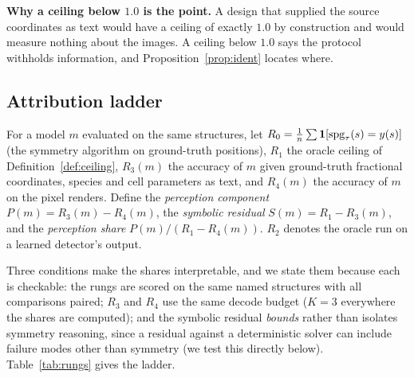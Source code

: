 \textbf{Why a ceiling below $1.0$ is the point.} A design that supplied the source coordinates as text
would have a ceiling of exactly $1.0$ by construction and would measure nothing about the images. A ceiling
below $1.0$ says the protocol withholds information, and Proposition~\ref{prop:ident} locates where.

\subsection{Attribution ladder}
\label{sec:ladder}

\begin{definition}
\label{def:ladder}
For a model $m$ evaluated on the same structures, let
$R_0 = \tfrac{1}{n}\sum \mathbf{1}[\mathrm{spg}_\tau(s) = y(s)]$ (the symmetry algorithm on ground-truth positions),
$R_1$ the oracle ceiling of Definition~\ref{def:ceiling},
$R_3(m)$ the accuracy of $m$ given ground-truth fractional coordinates, species and cell parameters as
text, and
$R_4(m)$ the accuracy of $m$ on the pixel renders. Define the \emph{perception component}
$P(m) = R_3(m) - R_4(m)$, the \emph{symbolic residual} $S(m) = R_1 - R_3(m)$, and the \emph{perception
share} $P(m) / (R_1 - R_4(m))$. $R_2$ denotes the oracle run on a learned detector's output.
\end{definition}

Three conditions make the shares interpretable, and we state them because each is checkable: the rungs are
scored on the same named structures with all comparisons paired; $R_3$ and $R_4$ use the same decode budget
($K{=}3$ everywhere the shares are computed); and the symbolic residual \emph{bounds} rather than isolates
symmetry reasoning, since a residual against a deterministic solver can include failure modes other than
symmetry (we test this directly below). Table~\ref{tab:rungs} gives the ladder.


